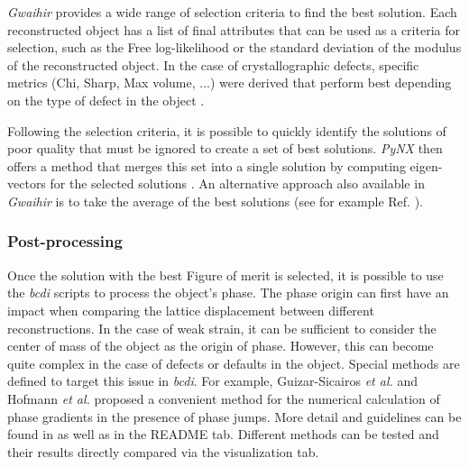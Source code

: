 \textit{Gwaihir} provides a wide range of selection criteria to find the best solution.
Each reconstructed object has a list of final attributes that can be used as a criteria for selection, such as the Free log-likelihood \cite{pynx2020FLLK} or the standard deviation of the modulus of the reconstructed object.
In the case of crystallographic defects, specific metrics (Chi, Sharp, Max volume, ...) were derived that perform best depending on the type of defect in the object \cite{Ulvestad2017}.

Following the selection criteria, it is possible to quickly identify the solutions of poor quality that must be ignored to create a set of best solutions.
\textit{PyNX} then offers a method that merges this set into a single solution by computing eigen-vectors for the selected solutions \cite{pynx2020FLLK}.
An alternative approach also available in \textit{Gwaihir} is to take the average of the best solutions (see for example Ref. \cite{ulvestad_nanoscale_2014}).


\subsubsection{Post-processing}

Once the solution with the best Figure of merit is selected, it is possible to use the \textit{bcdi} scripts to process the object's phase. The phase origin can first have an impact when comparing the lattice displacement between different reconstructions. In the case of weak strain, it can be sufficient to consider the center of mass of the object as the origin of phase.
However, this can become quite complex in the case of defects or defaults in the object. Special methods are defined to target this issue in \textit{bcdi}. For example, Guizar-Sicairos \textit{et al.} \cite{guizar-sicairos_phase_2011} and Hofmann \textit{et al.} \cite{hofmann_nanoscale_2020} proposed a convenient method for the numerical calculation of phase gradients in the presence of phase jumps.  More detail and guidelines can be found in \cite{Carnis2019_scientific_reports,jerome_carnis_2021_5741935} as well as in the README tab.
Different methods can be tested and their results directly compared via the visualization tab.

